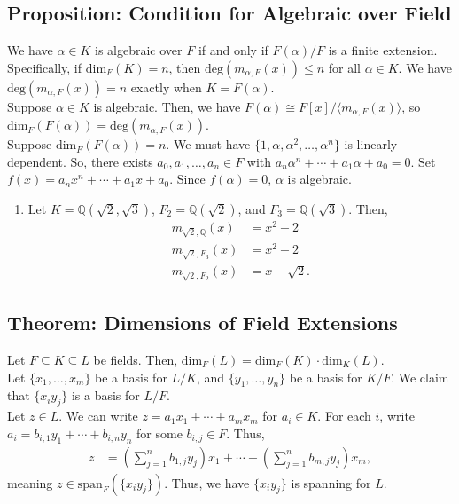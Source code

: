 \documentclass[10pt]{extarticle}
\newcommand{\Q}{\mathbb{Q}}
\begin{document}
  \subsection{Proposition: Condition for Algebraic over Field}%
  We have $\alpha \in K$ is algebraic over $F$ if and only if $F(\alpha)/F$ is a finite extension. Specifically, if $\text{dim}_{F}(K) = n$, then $\text{deg}(m_{\alpha,F}(x)) \leq n$ for all $\alpha \in K$. We have $\text{deg}(m_{\alpha,F}(x)) = n$ exactly when $K = F(\alpha)$.\\

  Suppose $\alpha \in K$ is algebraic. Then, we have $F(\alpha) \cong F[x]/\langle m_{\alpha,F}(x)\rangle$, so $\text{dim}_{F}(F(\alpha)) = \text{deg}(m_{\alpha,F}(x))$.\\

  Suppose $\text{dim}_{F}(F(\alpha)) = n$. We must have $\{1,\alpha,\alpha^2,\dots,\alpha^n\}$ is linearly dependent. So, there exists $a_0,a_1,\dots,a_n\in F$ with $a_n\alpha^n + \cdots + a_1\alpha + a_0 = 0$. Set $f(x) = a_nx^n + \cdots + a_1 x + a_0$. Since $f(\alpha) = 0$, $\alpha$ is algebraic.
  \begin{enumerate}[(1)]
    \item Let $K = \Q(\sqrt{2},\sqrt{3})$, $F_2 = \Q(\sqrt{2})$, and $F_3 = \Q(\sqrt{3})$. Then,
      \begin{align*}
        m_{\sqrt{2},\Q}(x) &= x^2 - 2\\
        m_{\sqrt{2},F_3}(x) &= x^2 - 2\\
        m_{\sqrt{2},F_2}(x) &= x-\sqrt{2}.
      \end{align*}
  \end{enumerate}
  \subsection{Theorem: Dimensions of Field Extensions}%
  Let $F\subseteq K \subseteq L$ be fields. Then, $\text{dim}_{F}(L) = \text{dim}_{F}(K)\cdot\text{dim}_{K}(L)$.\\

  Let $\{x_1,\dots,x_m\}$ be a basis for $L/K$, and $\{y_1,\dots,y_n\}$ be a basis for $K/F$. We claim that $\{x_iy_j\}$ is a basis for $L/F$.\\

  Let $z\in L$. We can write $z = a_1x_1 + \cdots + a_mx_m$ for $a_i\in K$. For each $i$, write $a_i = b_{i,1}y_1 + \cdots + b_{i,n}y_n$ for some $b_{i,j}\in F$. Thus,
  \begin{align*}
    z &= \left(\sum_{j=1}^{n}b_{1,j}y_j\right)x_1 + \cdots + \left(\sum_{j=1}^{n}b_{m,j}y_j\right)x_m,
  \end{align*}
  meaning $z\in \text{span}_{F}(\{x_iy_j\})$. Thus, we have $\{x_iy_j\}$ is spanning for $L$.\\
\end{document}
